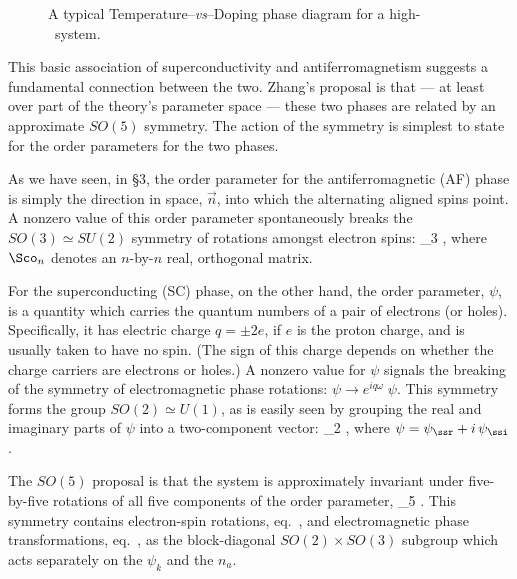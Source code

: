 \begin{figure}
\vspace{2.4in}
\caption{A typical Temperature--{\it vs}--Doping phase
diagram for a high-\Tc\ system.}
\end{figure}


This basic association of superconductivity and 
antiferromagnetism suggests a fundamental  connection
between the two. Zhang's proposal is that --- at least over
part of the theory's parameter  space --- these two phases
are related by an approximate  $SO(5)$ symmetry. The action
of the symmetry is simplest to state for the order
parameters for the two phases.

As we have seen, in \S3, the order parameter for the
antiferromagnetic (AF) phase is simply the direction in
space, 
$\vec n$, into which the alternating aligned spins point. A
nonzero value of this order parameter spontaneously breaks
the $SO(3) 
\simeq SU(2)$ symmetry of rotations amongst electron spins: 
%
\eq
\label{sothreedef}
\to \Sco_3  \;  ,
\eeq
%
where $\Sco_n$ denotes an $n$-by-$n$ real, orthogonal
matrix.

For the superconducting (SC) phase, on the other hand, the
order parameter, $\psi$, is a quantity which carries the
quantum numbers of a pair of electrons (or holes).
Specifically, it has electric charge $q =  \pm2 e$, if $e$
is the proton charge, and is usually taken to have no
spin.  (The sign of this charge depends on whether the
charge carriers are electrons or holes.) A nonzero value
for $\psi$ signals the breaking of the symmetry of
electromagnetic phase rotations:  $\psi \to e^{iq \omega}
\; \psi$. This symmetry forms the group $SO(2) \simeq
U(1)$, as is easily seen by grouping the real and imaginary
parts of $\psi$ into a two-component vector:
%
\eq
\label{sotwodef}
\pmatrix{\psi_\ssr \cr \psi_\ssi \cr} \to 
\Sco_2  \; \pmatrix{\psi_\ssr \cr
\psi_\ssi \cr} ,  \eeq
%
where $\psi = \psi_\ssr + i \, \psi_\ssi$.

The $SO(5)$ proposal is that the system is approximately
invariant under five-by-five rotations of all five 
components of the order parameter,
%
\eq
\label{sofivedef}
 \to \Sco_5
\;  .
\eeq
%
This symmetry contains electron-spin rotations, 
eq.~, and electromagnetic phase
transformations, eq.~, as the
block-diagonal  $SO(2) \times SO(3)$ subgroup which acts
separately on the $\psi_k$ and the $n_a$.

